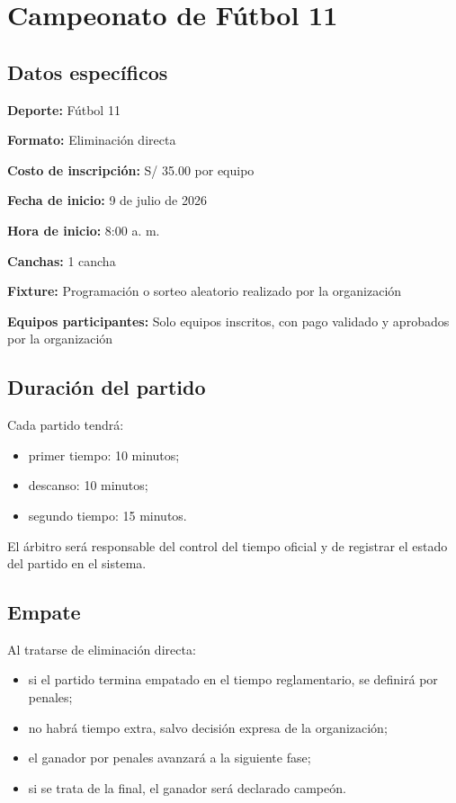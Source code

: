 \documentclass[12pt,a4paper]{article}
\newcommand{\dato}[2]{\noindent\textbf{#1:} #2\par\vspace{0.25em}}
\begin{document}
\section{Campeonato de Fútbol 11}

\subsection{Datos específicos}

\dato{Deporte}{Fútbol 11}
\dato{Formato}{Eliminación directa}
\dato{Costo de inscripción}{S/ 35.00 por equipo}
\dato{Fecha de inicio}{9 de julio de 2026}
\dato{Hora de inicio}{8:00 a. m.}
\dato{Canchas}{1 cancha}
\dato{Fixture}{Programación o sorteo aleatorio realizado por la organización}
\dato{Equipos participantes}{Solo equipos inscritos, con pago validado y aprobados por la organización}

\subsection{Duración del partido}

Cada partido tendrá:

\begin{itemize}
  \item primer tiempo: 10 minutos;
  \item descanso: 10 minutos;
  \item segundo tiempo: 15 minutos.
\end{itemize}

El árbitro será responsable del control del tiempo oficial y de registrar el estado del partido en el sistema.

\subsection{Empate}

Al tratarse de eliminación directa:

\begin{itemize}
  \item si el partido termina empatado en el tiempo reglamentario, se definirá por penales;
  \item no habrá tiempo extra, salvo decisión expresa de la organización;
  \item el ganador por penales avanzará a la siguiente fase;
  \item si se trata de la final, el ganador será declarado campeón.
\end{itemize}
\end{document}
